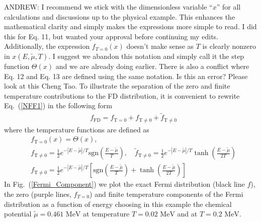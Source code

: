 \documentclass[sn-mathphys,Numbered]{sn-jnl}
\newcommand*{\MeV}{\text{ MeV}}
\newcommand*{\xmagenta}{\color{magenta}}
\begin{document}
{\xmagenta ANDREW: I recommend we stick with the dimensionless variable ``$x$'' for all calculations and discussions up to the physical example. This enhances the mathematical clarity and simply makes the expressions more simple to read. I did this for Eq. 11, but wanted your approval before continuing my edits. Additionally, the expression $f_{T=0}(x)$ doesn't make sense as $T$ is clearly nonzero in $x(E,\widetilde\mu,T)$. I suggest we abandon this notation and simply call it the step function $\Theta(x)$ and we are already doing earlier. There is also a conflict where Eq. 12 and Eq. 13 are defined using the same notation. Is this an error? Please look at this Cheng Tao.} To illustrate the separation of the zero and finite temperature contributions to the FD distribution, it is convenient to rewrite Eq.~(\ref{NFF1}) in the following form
\begin{align}\label{Eq_form}
&f_\mathrm{FD}=f_{\mathrm{T=0}}+f_\mathrm{T\neq0}+\tilde f_\mathrm{T\neq0}
\end{align}
where the temperature functions are defined as
\begin{align}
&f_{\mathrm{T=0}}(x)=\Theta(x),\\ &f_\mathrm{T\neq0}=\frac{1}{2}e^{ - |E-\widetilde\mu|/T }\mathrm{sgn}\left(\frac{E-\widetilde\mu}{T}\right),\quad\tilde f_\mathrm{T\neq0}=\frac{1}{2}e^{ - |E-\widetilde\mu|/T }\tanh\left(\frac{E-\widetilde\mu}{2T}\right)\\
&f_\mathrm{T\neq0}=\frac{1}{2}e^{ - |E-\widetilde\mu|/T }\left[\mathrm{sgn}\left(\frac{E-\widetilde\mu}{T}\right)+\tanh\left(\frac{E-\widetilde\mu}{2T}\right)\right]
\end{align}
In Fig.~(\ref{Fermi_Component}) we plot the exact Fermi distribution (black line $f$), the zero (purple lines, $f_{T=0}$) and finite temperature components of the Fermi distribution as a function of energy choosing in this example the chemical potential $\widetilde\mu=0.461\MeV$ at temperature $T=0.02\MeV$ and at $T=0.2\MeV$.
\end{document}
